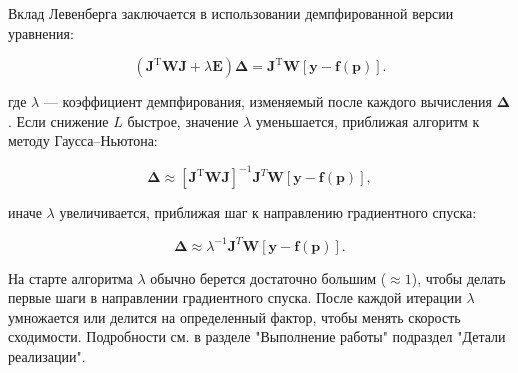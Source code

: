 Вклад Левенберга заключается в использовании демпфированной версии уравнения:

$$
	\left (\mathbf J^{\mathrm T} \boldsymbol{W} \mathbf J + \lambda \mathbf{E} \right ) \boldsymbol\Delta = \mathbf J^{\mathrm T}\boldsymbol{W}\left [\mathbf y - \mathbf f\left ( \boldsymbol p\right )\right ].
$$

где $\lambda$ — коэффициент демпфирования, изменяемый после каждого вычисления $\boldsymbol{\Delta}$. Если снижение $L$ быстрое, значение $\lambda$ уменьшается, приближая алгоритм к методу Гаусса–Ньютона:

$$
	\boldsymbol{\Delta}\approx[\mathbf J^{\mathrm T} \boldsymbol{W} \mathbf J]^{-1}\mathbf{J}^{T}\boldsymbol{W}[\mathbf y - \mathbf f\left ( \mathbf{p}\right )],
$$

иначе $\lambda$ увеличивается, приближая шаг к направлению градиентного спуска:

$$
	\boldsymbol{\Delta}\approx\lambda^{-1}\mathbf{J}^{T}\boldsymbol{W}[\mathbf y - \mathbf f\left ( \mathbf{p}\right )].
$$

На старте алгоритма $\lambda$ обычно берется достаточно большим ($\approx 1$), чтобы делать первые шаги в направлении градиентного спуска. После каждой итерации $\lambda$ умножается или делится на определенный фактор, чтобы менять скорость сходимости. 
Подробности см. в разделе "Выполнение работы"  подраздел "Детали реализации".

\newpage